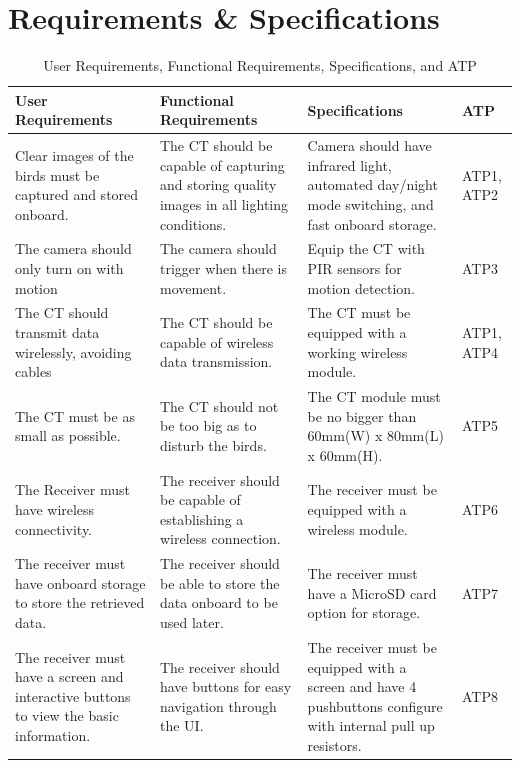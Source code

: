 \documentclass[class=report,11pt,crop=false]{standalone}
\begin{document}
\section{Requirements \& Specifications}
\begin{table}[h]
\centering
\begin{tabular}{|p{4cm}|p{5cm}|p{5cm}|p{1cm}|}
\hline
\textbf{User Requirements} & \textbf{Functional Requirements} & \textbf{Specifications} & \textbf{ATP} \\
\hline
Clear images of the birds must be captured and stored onboard. & The CT should be capable of capturing and storing quality images in all lighting conditions. & Camera should have infrared light, automated day/night mode switching, and fast onboard storage. & ATP1, ATP2 \\
\hline
The camera should only turn on with motion & The camera should trigger when there is movement. & Equip the CT with PIR sensors for motion detection. & ATP3 \\
\hline
The CT should transmit data wirelessly, avoiding cables & The CT should be capable of wireless data transmission. & The CT must be equipped with a working wireless module. & ATP1, ATP4 \\
\hline
The CT must be as small as possible. & The CT should not be too big as to disturb the birds. & The CT module must be no bigger than 60mm(W) x 80mm(L) x 60mm(H). & ATP5 \\
\hline
The Receiver must have wireless connectivity. & The receiver should be capable of establishing a wireless connection. & The receiver must be equipped with a wireless module. & ATP6 \\
\hline
The receiver must have onboard storage to store the retrieved data. & The receiver should be able to store the data onboard to be used later. & The receiver must have a MicroSD card option for storage. & ATP7 \\
\hline
The receiver must have a screen and interactive buttons to view the basic information. & The receiver should have buttons for easy navigation through the UI. & The receiver must be equipped with a screen and have 4 pushbuttons configure with internal pull up resistors. & ATP8 \\
\hline
\end{tabular}
\caption{User Requirements, Functional Requirements, Specifications, and ATP}
\label{tab:HW_Requirements}
\end{table}
\end{document}
